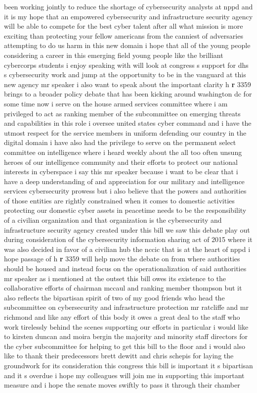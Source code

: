 \documentclass{article}
\begin{document}
been working jointly to reduce the shortage of cybersecurity analysts at nppd and it is my hope that an empowered cybersecurity and infrastructure security agency will be able to compete for the best cyber talent after all what mission is more exciting than protecting your fellow americans from the canniest of adversaries attempting to do us harm in this new domain i hope that all of the young people considering a career in this emerging field young people like the brilliant cybercorps students i enjoy speaking with will look at congress s support for dhs s cybersecurity work and jump at the opportunity to be in the vanguard at this new agency mr speaker i also want to speak about the important clarity h {\bf \color{red} r} 3359 brings to a broader policy debate that has been kicking around washington dc for some time now i serve on the house armed services committee where i am privileged to act as ranking member of the subcommittee on emerging threats and capabilities in this role i oversee united states cyber command and i have the utmost respect for the service members in uniform defending our country in the digital domain i have also had the privilege to serve on the permanent select committee on intelligence where i heard weekly about the all too often unsung heroes of our intelligence community and their efforts to protect our national interests in cyberspace i say this mr speaker because i want to be clear that i have a deep understanding of and appreciation for our military and intelligence services cybersecurity prowess but i also believe that the powers and authorities of those entities are rightly constrained when it comes to domestic activities protecting our domestic cyber assets in peacetime needs to be the responsibility of a civilian organization and that organization is the cybersecurity and infrastructure security agency created under this bill we saw this debate play out during consideration of the cybersecurity information sharing act of 2015 where it was also decided in favor of a civilian hub the nccic that is at the heart of nppd i hope passage of h {\bf \color{red} r} 3359 will help move the debate on from where authorities should be housed and instead focus on the operationalization of said authorities mr speaker as i mentioned at the outset this bill owes its existence to the collaborative efforts of chairman mccaul and ranking member thompson but it also reflects the bipartisan spirit of two of my good friends who head the subcommittee on cybersecurity and infrastructure protection mr ratcliffe and mr richmond and like any effort of this body it owes a great deal to the staff who work tirelessly behind the scenes supporting our efforts in particular i would like to kirsten duncan and moira bergin the majority and minority staff directors for the cyber subcommittee for helping to get this bill to the floor and i would also like to thank their predecessors brett dewitt and chris schepis for laying the groundwork for its consideration this congress this bill is important it s bipartisan and it s overdue i hope my colleagues will join me in supporting this important measure and i hope the senate moves swiftly to pass it through their chamber\pagebreak
\end{document}
